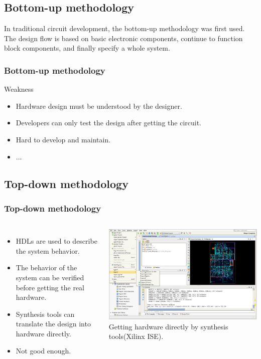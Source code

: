 \documentclass[12pt,beamer]{beamer}
\begin{document}
\subsection{Bottom-up methodology}

\begin{frame}[c]
	In traditional circuit development, the bottom-up methodology was first used. The design flow is based on basic electronic components, continue to function block components, and finally specify a whole system.
	
	\frametitle{Bottom-up methodology}
	\begin{block}{Weakness}
	\begin{itemize}
		\item Hardware design must be understood by the designer.
		\item Developers can only test the design after getting the circuit.
		\item Hard to develop and maintain.
		\item ...
	\end{itemize}
	\end{block}
\end{frame}

\subsection{Top-down methodology}
\begin{frame}[c]
	\frametitle{Top-down methodology}
		\begin{columns}[T]
			\begin{itemize}
			\setlength{\itemsep}{5pt}
			\item HDLs are used to describe the system behavior.
			\item The behavior of the system can be verified before getting the real hardware.
			\item Synthesis tools can translate the design into hardware directly.
			\item Not good enough.
			\end{itemize}

			\includegraphics[width=\textwidth]{pic/xilinx.png}\\
			Getting hardware directly by synthesis tools(Xilinx ISE).
		\end{columns}
\end{frame}
\end{document}
